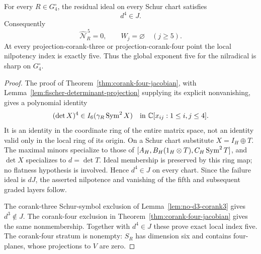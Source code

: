 \begin{theorem}
\label{thm:sharp-global-jacobian-depth}
For every \(R\in G_4^\circ\), the residual ideal on every Schur
chart satisfies
\[
 d^4\in J.
\]
Consequently
\[
 \widehat{\mathcal N}_R^{\,5}=0,
 \qquad W_j=\varnothing\quad(j\ge5).
\]
At every projection-corank-three or projection-corank-four point the
local nilpotency index is exactly five.  Thus the global exponent five
for the nilradical is sharp on \(G_4^\circ\).
\end{theorem}
\begin{proof}
The proof of Theorem~\ref{thm:corank-four-jacobian}, with
Lemma~\ref{lem:fischer-determinant-projection} supplying its explicit
nonvanishing, gives a polynomial identity
\[
 (\det X)^4\in I_6(\gamma_R\operatorname{Sym}^2X)
 \quad\text{in }\mathbb C[x_{ij}:1\le i,j\le4].
\]
It is an identity in the coordinate ring of the entire matrix space,
not an identity valid only in the local ring of its origin.  On a Schur
chart substitute \(X=I_H\oplus T\).  The maximal minors specialize
to those of
\([A_H,B_H(1_H\otimes T),C_H\operatorname{Sym}^2T]\), and \(\det X\) specializes
to \(d=\det T\).  Ideal membership is preserved by this ring map;
no flatness hypothesis is involved.  Hence \(d^4\in J\) on every
chart.  Since the failure ideal is \(dJ\), the asserted nilpotence
and vanishing of the fifth and subsequent graded layers follow.

The corank-three Schur-symbol exclusion of
Lemma~\ref{lem:no-d3-corank3} gives \(d^3\notin J\).
The corank-four exclusion in
Theorem~\ref{thm:corank-four-jacobian} gives the same nonmembership.
Together with \(d^4\in J\) these prove exact local index five.
The corank-four stratum is nonempty: \(S_R\) has dimension six and
contains four-planes, whose projections to \(V\) are zero.
\end{proof}

